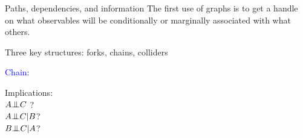 \documentclass[xcolor=dvipsnames]{beamer}
\newcommand{\indep}{{\bot\negthickspace\negthickspace\bot}}
\begin{document}
%




\begin{frame}{Paths, dependencies, and information}  
 The first use of graphs is to get a handle on what observables will be conditionally or marginally associated with what others. \\

\medskip

 Three key structures: forks, chains, colliders \\

\medskip

 \textcolor{Blue}{Chain}:
\begin{center}
\end{center}

 Implications:\\
\medskip
  $A \indep C$ ? \\
 \medskip
{} $A \indep C | B$? \\
\medskip
{} $ B \indep C | A $? 
\end{frame}
\end{document}

